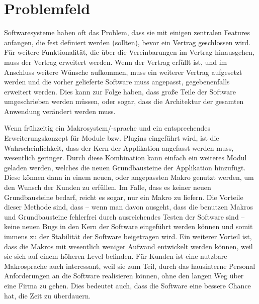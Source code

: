 \section{Problemfeld}
\label{sec:problemfeld}


  Softwaresysteme haben oft das Problem, dass sie mit einigen zentralen Features anfangen, die fest definiert werden (sollten), bevor ein Vertrag geschlossen wird. Für weitere Funktionalität, die über die Vereinbarungen im Vertrag hinausgehen, muss der Vertrag erweitert werden. Wenn der Vertrag erfüllt ist, und im Anschluss weitere Wünsche aufkommen, muss ein weiterer Vertrag aufgesetzt werden und die vorher gelieferte Software muss angepasst, gegebenenfalls erweitert werden. Dies kann zur Folge haben, dass große Teile der Software umgeschrieben werden müssen, oder sogar, dass die Architektur der gesamten Anwendung verändert werden muss.

  Wenn frühzeitig ein Makrosystem/-sprache und ein entsprechendes Erweiterungskonzept für Module bzw. Plugins eingeführt wird, ist die Wahrscheinlichkeit, dass der Kern der Applikation angefasst werden muss, wesentlich geringer. Durch diese Kombination kann einfach ein weiteres Modul geladen werden, welches die neuen Grundbausteine der Applikation hinzufügt. Diese können dann in einem neuen, oder angepassten Makro genutzt werden, um den Wunsch der Kunden zu erfüllen. Im Falle, dass es keiner neuen Grundbausteine bedarf, reicht es sogar, nur ein Makro zu liefern. Die Vorteile dieser Methode sind, dass -- wenn man davon ausgeht, dass die benutzen Makros und Grundbausteine fehlerfrei durch ausreichendes Testen der Software sind -- keine neuen Bugs in den Kern der Software eingeführt werden können und somit immens zu der Stabilität der Software beigetragen wird. Ein weiterer Vorteil ist, dass die Makros mit wesentlich weniger Aufwand entwickelt werden können, weil sie sich auf einem höheren Level befinden. Für Kunden ist eine nutzbare Makrosprache auch interessant, weil sie zum Teil, durch das hausinterne Personal Anforderungen an die Software realisieren können, ohne den langen Weg über eine Firma zu gehen. Dies bedeutet auch, dass die Software eine bessere Chance hat, die Zeit zu überdauern.

